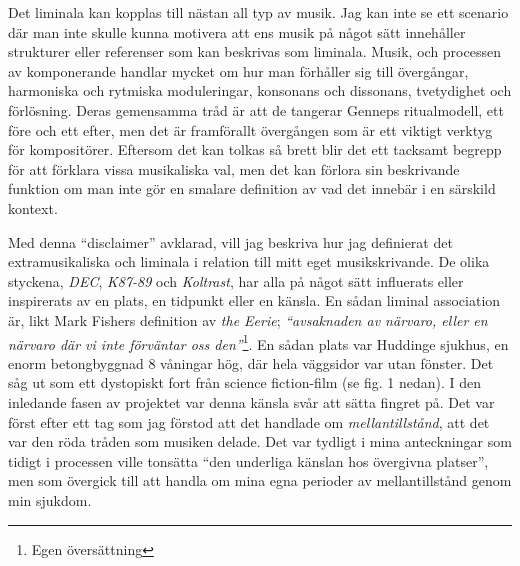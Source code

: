 \documentclass{article}
\begin{document}

Det liminala kan kopplas till nästan all typ av musik. Jag kan inte se ett scenario där man inte skulle kunna
motivera att ens musik på något sätt innehåller strukturer eller referenser som kan beskrivas som liminala.
Musik, och processen av komponerande handlar mycket om hur man förhåller sig till övergångar, harmoniska och
rytmiska moduleringar, konsonans och dissonans, tvetydighet och förlösning. Deras gemensamma tråd är att de
tangerar Genneps ritualmodell, ett före och ett efter, men det är framförallt övergången som är ett viktigt
verktyg för kompositörer. Eftersom det kan tolkas så brett blir det ett tacksamt begrepp för att förklara
vissa musikaliska val, men det kan förlora sin beskrivande funktion om man inte gör en smalare definition av
vad det innebär i en särskild kontext.

Med denna ``disclaimer'' avklarad, vill jag beskriva hur jag definierat det extramusikaliska och liminala i
relation till mitt eget musikskrivande. De olika styckena, \emph{DEC}, \emph{K87-89} och \emph{Koltrast}, har
alla på något sätt influerats eller inspirerats av en plats, en tidpunkt eller en känsla. 
En sådan liminal association är, likt Mark Fishers definition av \emph{the Eerie};
\emph{``avsaknaden av närvaro, eller en närvaro där vi inte förväntar oss den''}\footnote{Egen översättning}. En
sådan plats var Huddinge sjukhus, en enorm betongbyggnad 8 våningar hög, där hela väggsidor var utan fönster.
Det såg ut som ett dystopiskt fort från science fiction-film (se fig. 1 nedan). I den inledande fasen av
projektet var denna känsla svår att sätta fingret på. Det var först efter ett tag som jag förstod att det
handlade om \emph{mellantillstånd}, att det var den röda tråden som musiken delade. Det var tydligt i mina
anteckningar som tidigt i processen ville tonsätta ``den underliga känslan hos övergivna platser'', men som
övergick till att handla om mina egna perioder av mellantillstånd genom min sjukdom.
\end{document}
